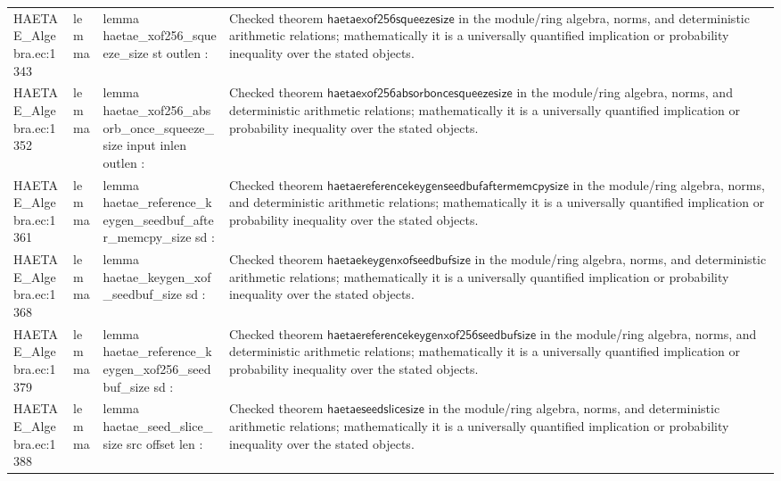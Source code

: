 \documentclass[10pt]{article}
\begin{document}
\begin{longtable}{L{0.11\textwidth}L{0.055\textwidth}L{0.385\textwidth}L{0.41\textwidth}}
HAETAE\_\allowbreak{}Algebra.\allowbreak{}ec:\allowbreak{}1343 & lemma & {\ttfamily\scriptsize lemma haetae\_\allowbreak{}xof256\_\allowbreak{}squeeze\_\allowbreak{}size st outlen :} & Checked theorem $\mathsf{haetaexof256squeezesize}$ in the module/ring algebra, norms, and deterministic arithmetic relations; mathematically it is a universally quantified implication or probability inequality over the stated objects. \\
HAETAE\_\allowbreak{}Algebra.\allowbreak{}ec:\allowbreak{}1352 & lemma & {\ttfamily\scriptsize lemma haetae\_\allowbreak{}xof256\_\allowbreak{}absorb\_\allowbreak{}once\_\allowbreak{}squeeze\_\allowbreak{}size input inlen outlen :} & Checked theorem $\mathsf{haetaexof256absorboncesqueezesize}$ in the module/ring algebra, norms, and deterministic arithmetic relations; mathematically it is a universally quantified implication or probability inequality over the stated objects. \\
HAETAE\_\allowbreak{}Algebra.\allowbreak{}ec:\allowbreak{}1361 & lemma & {\ttfamily\scriptsize lemma haetae\_\allowbreak{}reference\_\allowbreak{}keygen\_\allowbreak{}seedbuf\_\allowbreak{}after\_\allowbreak{}memcpy\_\allowbreak{}size sd :} & Checked theorem $\mathsf{haetaereferencekeygenseedbufaftermemcpysize}$ in the module/ring algebra, norms, and deterministic arithmetic relations; mathematically it is a universally quantified implication or probability inequality over the stated objects. \\
HAETAE\_\allowbreak{}Algebra.\allowbreak{}ec:\allowbreak{}1368 & lemma & {\ttfamily\scriptsize lemma haetae\_\allowbreak{}keygen\_\allowbreak{}xof\_\allowbreak{}seedbuf\_\allowbreak{}size sd :} & Checked theorem $\mathsf{haetaekeygenxofseedbufsize}$ in the module/ring algebra, norms, and deterministic arithmetic relations; mathematically it is a universally quantified implication or probability inequality over the stated objects. \\
HAETAE\_\allowbreak{}Algebra.\allowbreak{}ec:\allowbreak{}1379 & lemma & {\ttfamily\scriptsize lemma haetae\_\allowbreak{}reference\_\allowbreak{}keygen\_\allowbreak{}xof256\_\allowbreak{}seedbuf\_\allowbreak{}size sd :} & Checked theorem $\mathsf{haetaereferencekeygenxof256seedbufsize}$ in the module/ring algebra, norms, and deterministic arithmetic relations; mathematically it is a universally quantified implication or probability inequality over the stated objects. \\
HAETAE\_\allowbreak{}Algebra.\allowbreak{}ec:\allowbreak{}1388 & lemma & {\ttfamily\scriptsize lemma haetae\_\allowbreak{}seed\_\allowbreak{}slice\_\allowbreak{}size src offset len :} & Checked theorem $\mathsf{haetaeseedslicesize}$ in the module/ring algebra, norms, and deterministic arithmetic relations; mathematically it is a universally quantified implication or probability inequality over the stated objects. \\

\end{longtable}
\end{document}
